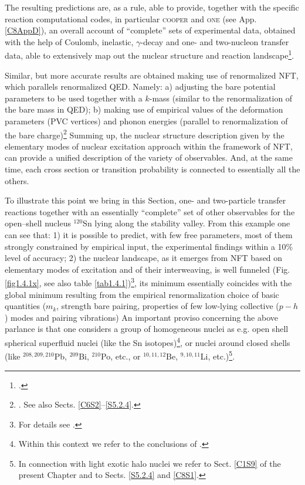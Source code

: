 The resulting predictions are, as a rule, able to provide, together with the specific reaction computational codes, in particular \textsc{cooper} and \textsc{one} (see App. \ref{C8AppD}), an overall account of ``complete'' sets of experimental data, obtained with the help of Coulomb, inelastic, $\gamma$-decay  and one- and two-nucleon transfer data, able to extensively map out the nuclear structure and reaction landscape\footnote{\cite{Idini:15,Idini:14,Potel:13}.}.


 Similar, but more accurate results are obtained  making use of renormalized NFT, which parallels renormalized QED. Namely: a) adjusting the bare potential parameters to be used together with a $k$-mass (similar to the renormalization of the bare mass in QED); b) making use of empirical values of the deformation parameters (PVC vertices) and phonon energies (parallel to renormalization of the bare charge)\footnote{\cite{Barranco:17,Barranco:20}. See also Sects. \ref{C6S2}--\ref{S5.2.4}.}
 Summing up, the nuclear structure description given by the elementary modes of nuclear excitation approach within the framework of NFT, can provide a unified description of the variety of observables. And, at the same time, each cross section or transition probability is connected to essentially all the others.


To illustrate this point we  bring   in this Section,  one- and two-particle transfer reactions together with an essentially ``complete'' set of other  observables  for the open--shell nucleus $^{120}$Sn lying  along the stability valley. From this example one can see that: 1) it is possible to predict, with few free parameters, most of them strongly constrained by empirical input, the experimental findings within a 10\% level of accuracy; 2) the nuclear landscape, as it emerges from NFT based on elementary modes of excitation and of their interweaving, is well funneled (Fig. \ref{fig1.4.1x}, see also table \ref{tab1.4.1})\footnote{For details see \cite{Idini:15}.}, its minimum essentially coincides with the global minimum resulting from the empirical renormalization choice of basic quantities ($m_k$, strength bare pairing, properties of few low-lying collective ($p-h$) modes  and pairing vibrations) An important proviso concerning the above parlance is that one considers a group of homogeneous nuclei as e.g. open shell spherical superfluid nuclei (like the Sn isotopes)\footnote{Within this context we refer to the conclusions of \cite{Idini:15}.}, or nuclei around closed shells (like $^{208,209,210}$Pb, $^{209}$Bi, $^{210}$Po, etc., or $^{10,11,12}$Be, $^{9,10,11}$Li, etc.)\footnote{In connection with light exotic halo nuclei we refer to Sect. \ref{C1S9} of the present Chapter and to Sects. \ref{S5.2.4} and \ref{C8S1}.}. 



